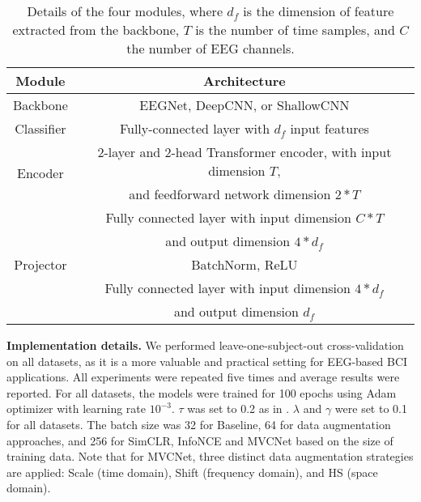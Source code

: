 \documentclass[journal]{IEEEtran}
\begin{document}
\begin{table}[htbp]   \centering \setlength{\tabcolsep}{0.5mm}
\footnotesize 
  \caption{Details of the four modules, where $d_f$ is the dimension of feature extracted from the backbone, $T$ is the number of time samples, and $C$ the number of EEG channels.}
    \begin{tabular}{c|c}
    \toprule
    Module & Architecture \\
    \midrule
    Backbone & EEGNet, DeepCNN, or ShallowCNN \\
    \midrule
    Classifier & Fully-connected layer with $d_f$ input features\\
    \midrule
    \multirow{2}{*}{Encoder} & 2-layer and 2-head Transformer encoder, with input dimension $T$, \\
    & and feedforward network dimension $2*T$ \\
    \midrule
    \multirow{6}{*}{Projector} 
    & Fully connected layer with input dimension $C*T$ \\
    & and output dimension $4*d_f$ \\
    & BatchNorm, ReLU\\
    & Fully connected layer with input dimension $4*d_f$ \\
    & and output dimension $d_f$ \\
    \bottomrule
    \end{tabular}
  \label{tab:network}
\end{table}

\noindent\textbf{Implementation details.} We performed leave-one-subject-out cross-validation on all datasets, as it is a more valuable and practical setting for EEG-based BCI applications. All experiments were repeated five times and average results were reported. For all datasets, the models were trained for 100 epochs using Adam optimizer with learning rate $10^{-3}$. $\tau$ was set to 0.2 as in \cite{chen2020simclrv2}. $\lambda$ and $\gamma$ were set to 0.1 for all datasets. The batch size was 32 for Baseline, 64 for data augmentation approaches, and 256 for SimCLR, InfoNCE and MVCNet based on the size of training data. Note that for MVCNet, three distinct data augmentation strategies are applied: Scale (time domain), Shift (frequency domain), and HS (space domain). 
\end{document}
